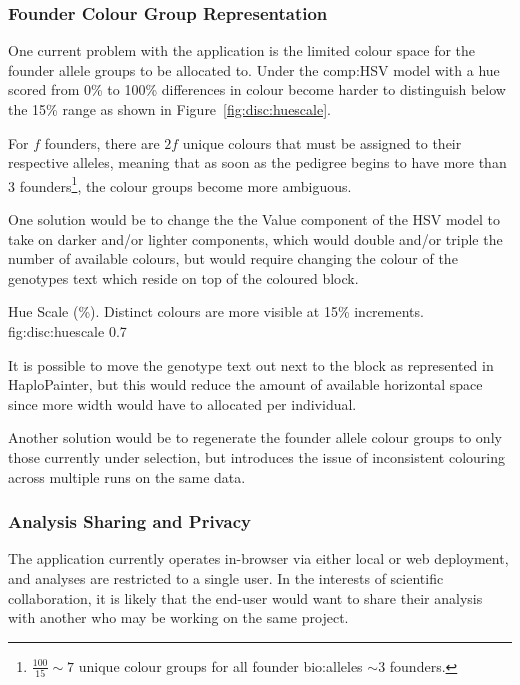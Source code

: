 \subsubsection{Founder Colour Group Representation}
One current problem with the application is the limited colour space for the founder allele groups to be allocated to. Under the \gls{comp:HSV} model with a hue scored from 0\% to 100\% differences in colour become harder to distinguish below the 15\% range as shown in Figure~\ref{fig:disc:huescale}. 

For $f$ founders, there are $2f$ unique colours that must be assigned to their respective alleles, meaning that as soon as the pedigree begins to have more than 3 founders\footnote{$ \frac{100}{15} \sim 7 $ unique colour groups for all founder \gls{bio:alleles} $ \sim 3$ founders.}, the colour groups become more ambiguous.

One solution would be to change the the Value component of the HSV model to take on darker and/or lighter components, which would double and/or triple the number of available colours, but would require changing the colour of the genotypes text which reside on top of the coloured block. 

{Hue Scale (\%). Distinct colours are more visible at 15\% increments.}
{fig:disc:huescale}
{0.7}{}

It is possible to move the genotype text out next to the block as represented in HaploPainter, but this would reduce the amount of available horizontal space since more width would have to allocated per individual.

Another solution would be to regenerate the founder allele colour groups to only those currently under selection, but introduces the issue of inconsistent colouring across multiple runs on the same data.


\subsubsection{Analysis Sharing and Privacy}

The application currently operates in-browser via either local or web deployment, and analyses are restricted to a single user. In the interests of scientific collaboration, it is likely that the end-user would want to share their analysis with another who may be working on the same project.

